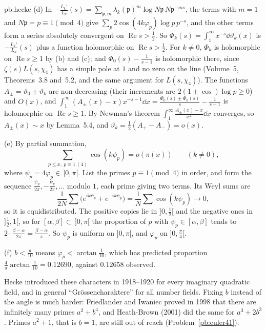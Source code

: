 \begin{solution}{pb:hecke}
(d) In $-\frac{L_k'}{L_k}(s)=\sum_{\mathfrak p,m}\lambda_k(\mathfrak p)^m\log N\mathfrak p\,N\mathfrak p^{-ms}$, the terms with $m=1$ and $N\mathfrak p=p\equiv1\pmod4$ give $\sum_p2\cos(4k\varphi_p)\log p\,p^{-s}$,
and the other terms form a series absolutely convergent on $\operatorname{Re}s>\frac12$. So $\Phi_k(s)=\int_1^\infty x^{-s}\dd\vartheta_k(x)$ is $-\frac{L_k'}{L_k}(s)$ plus a function holomorphic on
$\operatorname{Re}s>\frac12$. For $k\ne0$, $\Phi_k$ is holomorphic on $\operatorname{Re}s\ge1$ by (b) and (c); and $\Phi_0(s)-\frac1{s-1}$ is holomorphic there, since $\zeta(s)L(s,\chi_4)$ has a
simple pole at $1$ and no zero on the line (Volume~5, Theorems~3.8 and~5.2, and the same argument for $L(s,\chi_4)$). The functions $A_\pm=\vartheta_0\pm\vartheta_k$ are
non-decreasing (their increments are $2(1\pm\cos)\log p\ge0$) and $O(x)$, and $\int_1^\infty(A_\pm(x)-x)x^{-s-1}\dd x=\frac{\Phi_0(s)\pm\Phi_k(s)}s-\frac1{s-1}$ is holomorphic on
$\operatorname{Re}s\ge1$. By Newman's theorem $\int_1^\infty\frac{A_\pm(x)-x}{x^2}\dd x$ converges, so $A_\pm(x)\sim x$ by Lemma~5.4, and $\vartheta_k=\frac12(A_+-A_-)=o(x)$.

(e) By partial summation,
\[
\sum_{p\le x,\ p\equiv1\,(4)}\cos(k\psi_p)=o(\pi(x))\qquad(k\ne0),
\]
where $\psi_p=4\varphi_p\in\,]0,\pi[$. List the primes $p\equiv1\pmod4$ in order, and form the
sequence $\frac{\psi_{p}}{2\pi},-\frac{\psi_{p}}{2\pi},\dots$ modulo $1$, each prime giving two terms. Its Weyl sums are
\[
\frac1{2N}\sum\bigl(e^{ik\psi_p}+e^{-ik\psi_p}\bigr)=\frac1N\sum\cos(k\psi_p)\to0,
\]
so it is equidistributed. The positive copies lie in $]0,\frac12[$ and the negative ones in $]\frac12,1[$, so for $[\alpha,\beta]\subset\,]0,\pi[$ the proportion of $p$ with
$\psi_p\in[\alpha,\beta]$ tends to $2\cdot\frac{\beta-\alpha}{2\pi}=\frac{\beta-\alpha}\pi$. So $\psi_p$ is uniform on $]0,\pi[$, and $\varphi_p$ on $]0,\frac\pi4[$.

(f) $b<\frac a{10}$ means $\varphi_p<\arctan\frac1{10}$, which has predicted proportion $\frac4\pi\arctan\frac1{10}=0.12690$, against $0.12658$ observed.


\leads Hecke introduced these characters in 1918--1920 for every imaginary quadratic field, and in general ``Grössencharaktere'' for all number fields. Fixing $b$ instead of the angle is
much harder: Friedlander and Iwaniec proved in 1998 that there are infinitely many primes $a^2+b^4$, and Heath-Brown (2001) did the same for $a^3+2b^3$. Primes $a^2+1$, that
is $b=1$, are still out of reach (Problem~\ref{pb:euler41}).
\end{solution}

